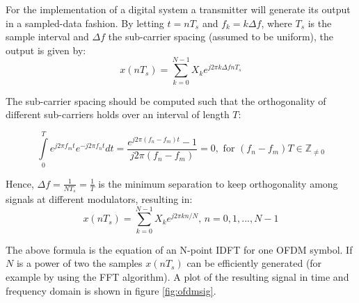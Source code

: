 \documentclass[12pt,a4paper,openright]{report}
\begin{document}
For the implementation of a digital system a transmitter will generate its output in a sampled-data fashion. By letting $t=nT_s$ and $f_k=k\Delta f$, where $T_s$ is the sample interval and $\Delta f$ the sub-carrier spacing (assumed to be uniform), the output is given by:
\begin{equation}
x(n{T_s}) = \sum\limits_{k = 0}^{N - 1} {{X_k}{e^{j2\pi k\Delta fn{T_s}}}}
\end{equation}

The sub-carrier spacing should be computed such that the orthogonality of different sub-carriers holds over an interval of length $T$:

\begin{equation}
\int\limits_0^T {{e^{j2\pi {f_m}t}}{e^{ - j2\pi {f_n}t}}} dt = \frac{{{e^{j2\pi ({f_n} - {f_m})t}} - 1}}{{j2\pi ({f_n} - {f_m})}} = 0,{\text{ for }}({f_n} - {f_m})T  \in \mathbb{Z}_{\neq 0}
\end{equation}

Hence, $\Delta f = \frac{1}{NT_s}=\frac{1}{T}$ is the minimum separation to keep orthogonality among signals at different modulators, resulting in:
\begin{equation}
x(n{T_s}) = \sum\limits_{k = 0}^{N - 1} {{X_k}{e^{j2\pi kn/N}}} \text{, }n = 0,1,...,N - 1
\end{equation}


The above formula is the equation of an N-point IDFT for one OFDM symbol. If $N$ is a power of two the samples $x(nT_s)$ can be efficiently generated (for example by using the FFT algorithm). A plot of the resulting signal in time and frequency domain is shown in figure \ref{fig:ofdmsig}.
\end{document}
